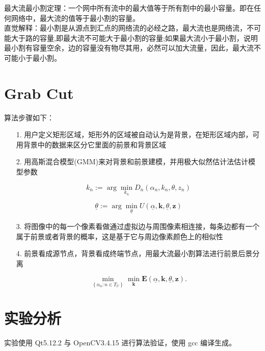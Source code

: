 \documentclass[12pt]{article}
\begin{document}
	最大流最小割定理：一个网中所有流中的最大值等于所有割中的最小容量。即在任何网络中，最大流的值等于最小割的容量。\\
	
	
	直觉解释：最小割是从源点到汇点的网络流的必经之路，最大流也是网络流，不可能大于路的容量,即最大流不可能大于最小割的容量;如果最大流小于最小割，说明最小割有容量空余，边的容量没有物尽其用，必然可以加大流量，因此，最大流不可能小于最小割。
	
	
	\section{Grab Cut}
	算法步骤如下：
	
	\begin{enumerate}
		\item [1.] 用户定义矩形区域，矩形外的区域被自动认为是背景，在矩形区域内部，可用背景中的数据来区分它里面的前景和背景区域
		\item [2.] 用高斯混合模型(GMM)来对背景和前景建模，并用极大似然估计法估计模型参数
		
		$$
		k_{n}:=\arg \min _{k_{n}} D_{n}\left(\alpha_{n}, k_{n}, \theta, z_{n}\right)
		$$
		
		$$
		\underline{\theta}:=\arg \min _{\underline{\theta}} U(\underline{\alpha}, \mathbf{k}, \underline{\theta}, \mathbf{z})
		$$
		
		\item [3.] 将图像中的每一个像素看做通过虚拟边与周围像素相连接，每条边都有一个属于前景或者背景的概率，这是基于它与周边像素颜色上的相似性
		\item [4.] 前景看成源节点，背景看成终端节点，用最大流最小割算法进行前景后景分离
		
		$$
		\min _{\left\{\alpha_{n}: n \in T_{U}\right\}} \min _{\mathbf{k}} \mathbf{E}(\underline{\alpha}, \mathbf{k}, \underline{\theta}, \mathbf{z}) .
		$$
		
	\end{enumerate}
	
	
	
	
	\section{实验分析}
	实验使用 Qt5.12.2 与 OpenCV3.4.15 进行算法验证，使用 gcc 编译生成。
	
\end{document}
